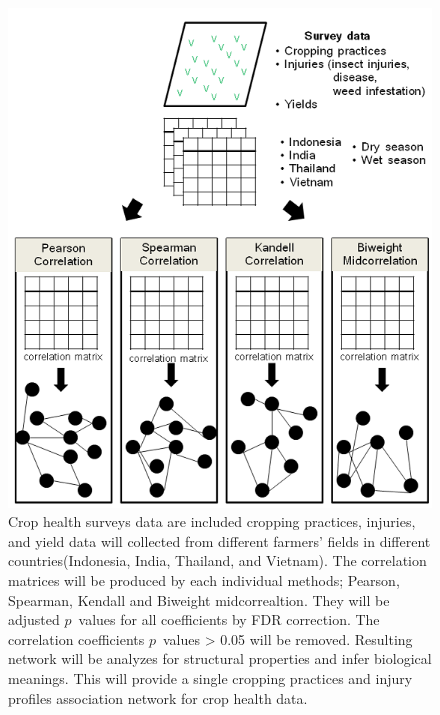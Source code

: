 \begin{figure}
\centering
\includegraphics[width = 6in]{pipeline}
\caption[Network method for characterizing interaction between injury profiles and cropping practices using correlation measures]{Crop health surveys data are included cropping practices, injuries, and yield data will collected from different farmers' fields in different countries(Indonesia, India, Thailand, and Vietnam). The correlation matrices will be produced by each individual methods; Pearson, Spearman, Kendall and Biweight midcorrealtion. They will be adjusted $p$~values for all coefficients by FDR correction. The correlation coefficients $p$~values > 0.05 will be removed. Resulting network will be  analyzes for structural properties and infer biological meanings. This will provide a single cropping practices and injury profiles association network for crop health data.}
\end{figure}

